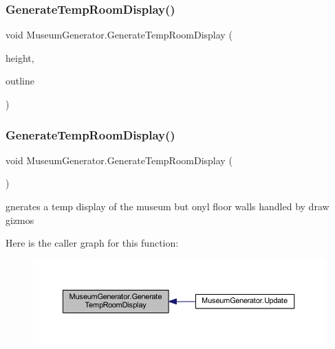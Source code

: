\subsubsection{\texorpdfstring{Generate\+Temp\+Room\+Display()}{GenerateTempRoomDisplay()}\hspace{0.1cm}{\footnotesize\ttfamily [1/2]}}
{\footnotesize\ttfamily void Museum\+Generator.\+Generate\+Temp\+Room\+Display (\begin{DoxyParamCaption}\item[{int}]{height,  }\item[{Hash\+Set$<$ int $>$}]{outline }\end{DoxyParamCaption})\hspace{0.3cm}{\ttfamily [private]}}

\mbox{\label{class_museum_generator_a1b9419222535f317005ca9fe1fe757f3}} 
\subsubsection{\texorpdfstring{Generate\+Temp\+Room\+Display()}{GenerateTempRoomDisplay()}\hspace{0.1cm}{\footnotesize\ttfamily [2/2]}}
{\footnotesize\ttfamily void Museum\+Generator.\+Generate\+Temp\+Room\+Display (\begin{DoxyParamCaption}{ }\end{DoxyParamCaption})\hspace{0.3cm}{\ttfamily [private]}}



gnerates a temp display of the museum but onyl floor walls handled by draw gizmos 

Here is the caller graph for this function\+:
\nopagebreak
\begin{figure}[H]
\begin{center}
\leavevmode
\includegraphics[width=350pt]{class_museum_generator_a1b9419222535f317005ca9fe1fe757f3_icgraph}
\end{center}
\end{figure}
\mbox{\label{class_museum_generator_a7c219625d39af0857271734995728a10}} 
